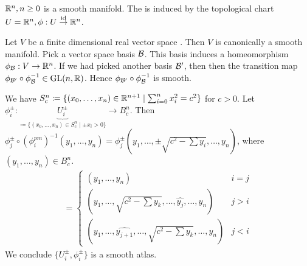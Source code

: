 \begin{example}
    \(\mathbb{R}^n,n\geq 0\) is  a smooth manifold. The  is induced by 
    the topological chart \(U=\mathbb{R}^n,\phi:U\stackrel{\text{id}}{\to}\mathbb{R}^n\).
\end{example}

\begin{example}
    Let \(V\) be a finite dimensional real vector space . Then \(V\) is canonically a smooth manifold. Pick 
    a vector space basis \(\mathcal{B}\). This basis induces a homeomorphism \(\phi_{\mathcal{B}}: V\to\mathbb{R}^n\). If we had picked another basis \(\mathcal{B}'\), then 
    then the transition map \(\phi_{\mathcal{B}'}\circ \phi_{\mathcal{B}}^{-1}\in\text{GL}(n,\mathbb{R})\). Hence \(\phi_{\mathcal{B}'}\circ \phi_{\mathcal{B}}^{-1}\)
    is smooth.
\end{example}

\begin{example}
    We have \(S_c^n\coloneqq\{(x_0,\dots,x_n)\in\mathbb{R}^{n+1}\mid \sum_{i=0}^n x_i^2=c^2\}\) for \(c>0\).
    Let \(\phi_i^{\pm}:\underbrace{U_i^{\pm}}_{\coloneqq \{(x_0,\dots,x_n)\in S_c^n\mid \pm x_i>0\}}\to B_c^n\).
    Then \(\phi_j^{\pm}\circ \left(\phi_{i}^{pm}\right)^{-1}(y_1,\dots,y_n)=\phi_j^\pm\left(y_1,\dots,\pm\sqrt{c^2-\sum y_i},\dots,y_n\right)\), where \((y_1,\dots,y_n)\in B_c^n\).
    \begin{align}
        =\begin{cases}
           (y_1,\dots,y_n) &i=j\\
            (y_1,\dots,\sqrt{c^2-\sum y_k},\dots,\hat{y_j},\dots,y_n) & j>i\\
            (y_1,\dots,\hat{y_{j+1}},\dots,\sqrt{c^2-\sum y_k},\dots,y_n) & j<i
        \end{cases}
    \end{align}
    We conclude \(\{U_{i}^\pm,\phi_i^\pm\}\) is a smooth atlas.
\end{example}

